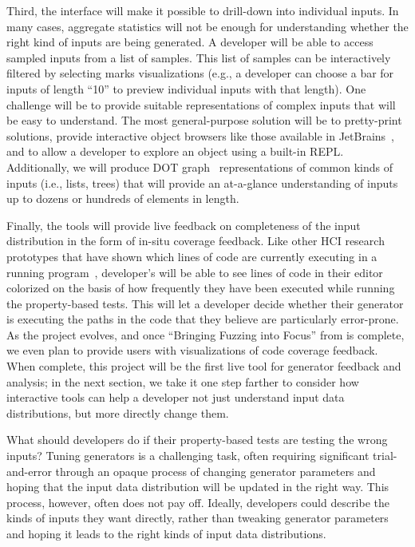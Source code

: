 Third, the interface will make it possible to drill-down into individual inputs.
In many cases, aggregate statistics will not be enough for understanding whether
the right kind of inputs are being generated. A developer will be able to access
sampled inputs from a list of samples. This list of samples can be interactively
filtered by selecting marks visualizations (e.g., a developer can choose a bar
for inputs of length ``10'' to preview individual inputs with that length). One
challenge will be to provide suitable representations of complex inputs that
will be easy to understand. The most general-purpose solution will be to
pretty-print solutions, provide interactive object browsers like those available
in JetBrains~\cite{tool:jetbrains}, and to allow a developer to explore an
object using a built-in REPL. Additionally, we will produce DOT
graph~\cite{ellson_graphviz_2002} representations of common kinds of inputs
(i.e., lists, trees) that will provide an at-a-glance understanding of inputs up
to dozens or hundreds of elements in length.

Finally, the tools will provide live feedback on completeness of the input
distribution in the form of in-situ coverage feedback. Like other HCI research
prototypes that have shown which lines of code are currently executing in a
running
program~\cite{ref:brandt2010rehearse,ref:oney2009firecrystal,ref:burg2013record},
developer's will be able to see lines of code in their editor colorized on the
basis of how frequently they have been executed while running the property-based
tests. This will let a developer decide whether their generator is executing the
paths in the code that they believe are particularly error-prone.
\iflater
As the project evolves, and once ``Bringing Fuzzing into Focus'' from
 is complete, we even plan to provide users with
visualizations of code coverage feedback.
\fi
When complete, this project will be the first live tool for generator
feedback and analysis; in the next section, we take it one step farther to
consider how interactive tools can help a developer not just understand input
data distributions, but more directly change them.


What should developers do if their property-based tests are testing the wrong
inputs? Tuning generators is a challenging task,
often requiring significant trial-and-error through an opaque process of
changing generator parameters and hoping that the input data distribution will
be updated in the right way. This process, however, often does not pay off.
Ideally, developers could describe the kinds of inputs they want directly,
rather than tweaking generator parameters and hoping it leads to the right kinds
of input data distributions.

